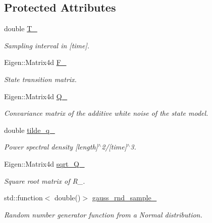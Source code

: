 \subsection*{Protected Attributes}
\begin{DoxyCompactItemize}
\item 
double \mbox{\hyperlink{classbfl_1_1WhiteNoiseAcceleration_a290395c4e27178fee72617c8a1750b6c}{T\+\_\+}}
\begin{DoxyCompactList}\small\item\em Sampling interval in \mbox{[}time\mbox{]}. \end{DoxyCompactList}\item 
Eigen\+::\+Matrix4d \mbox{\hyperlink{classbfl_1_1WhiteNoiseAcceleration_a59d7b07c95daa0c953b00ad3ba6c7b2e}{F\+\_\+}}
\begin{DoxyCompactList}\small\item\em State transition matrix. \end{DoxyCompactList}\item 
Eigen\+::\+Matrix4d \mbox{\hyperlink{classbfl_1_1WhiteNoiseAcceleration_afa211c432b7e915baa7abade5ad124d2}{Q\+\_\+}}
\begin{DoxyCompactList}\small\item\em Convariance matrix of the additive white noise of the state model. \end{DoxyCompactList}\item 
double \mbox{\hyperlink{classbfl_1_1WhiteNoiseAcceleration_ab65b133705fba509b0cf3675379573e6}{tilde\+\_\+q\+\_\+}}
\begin{DoxyCompactList}\small\item\em Power spectral density \mbox{[}length\mbox{]}$^\wedge$2/\mbox{[}time\mbox{]}$^\wedge$3. \end{DoxyCompactList}\item 
Eigen\+::\+Matrix4d \mbox{\hyperlink{classbfl_1_1WhiteNoiseAcceleration_ac3225b6f86554b010515c436b0d48576}{sqrt\+\_\+\+Q\+\_\+}}
\begin{DoxyCompactList}\small\item\em Square root matrix of R\+\_\+. \end{DoxyCompactList}\item 
std\+::function$<$ double()$>$ \mbox{\hyperlink{classbfl_1_1WhiteNoiseAcceleration_a6f025667b1a8fa08b3fca5d8c5d26aec}{gauss\+\_\+rnd\+\_\+sample\+\_\+}}
\begin{DoxyCompactList}\small\item\em Random number generator function from a Normal distribution. \end{DoxyCompactList}\end{DoxyCompactItemize}
